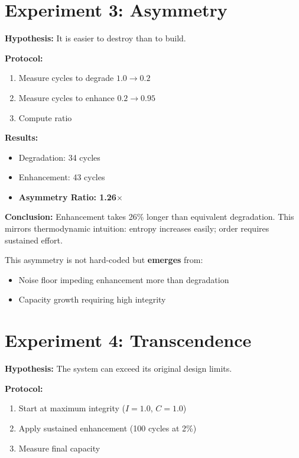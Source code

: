 \documentclass[a4paper,11pt,twocolumn]{article}
\begin{document}
\section{Experiment 3: Asymmetry}

\textbf{Hypothesis:} It is easier to destroy than to build.

\textbf{Protocol:}
\begin{enumerate}
    \item Measure cycles to degrade $1.0 \to 0.2$
    \item Measure cycles to enhance $0.2 \to 0.95$
    \item Compute ratio
\end{enumerate}

\textbf{Results:}

\begin{itemize}
    \item Degradation: 34 cycles
    \item Enhancement: 43 cycles
    \item \textbf{Asymmetry Ratio: 1.26$\times$}
\end{itemize}

\textbf{Conclusion:} Enhancement takes 26\% longer than equivalent degradation. This mirrors thermodynamic intuition: entropy increases easily; order requires sustained effort.

This asymmetry is not hard-coded but \textbf{emerges} from:
\begin{itemize}
    \item Noise floor impeding enhancement more than degradation
    \item Capacity growth requiring high integrity
\end{itemize}

\section{Experiment 4: Transcendence}

\textbf{Hypothesis:} The system can exceed its original design limits.

\textbf{Protocol:}
\begin{enumerate}
    \item Start at maximum integrity ($I = 1.0$, $C = 1.0$)
    \item Apply sustained enhancement (100 cycles at 2\%)
    \item Measure final capacity
\end{enumerate}
\end{document}
